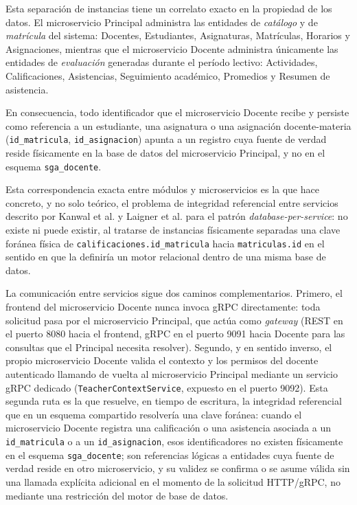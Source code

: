 \documentclass[11pt,a4paper]{article}
\begin{document}
Esta separación de instancias tiene un correlato exacto en la propiedad de los datos. El microservicio Principal administra las entidades de \emph{catálogo} y de \emph{matrícula} del sistema: Docentes, Estudiantes, Asignaturas, Matrículas, Horarios y Asignaciones, mientras que el microservicio Docente administra únicamente las entidades de \emph{evaluación} generadas durante el período lectivo: Actividades, Calificaciones, Asistencias, Seguimiento académico, Promedios y Resumen de asistencia. 

En consecuencia, todo identificador que el microservicio Docente recibe y persiste como referencia a un estudiante, una asignatura o una asignación docente-materia (\texttt{id\_matricula}, \texttt{id\_asignacion}) apunta a un registro cuya fuente de verdad reside físicamente en la base de datos del microservicio Principal, y no en el esquema \texttt{sga\_docente}.

Esta correspondencia exacta entre módulos y microservicios es la que hace concreto, y no solo teórico, el problema de integridad referencial entre servicios descrito por Kanwal et al. y Laigner et al. para el patrón \emph{database-per-service}: no existe ni puede existir, al tratarse de instancias físicamente separadas una clave foránea física de \texttt{calificaciones.id\_matricula} hacia \texttt{matriculas.id} en el sentido en que la definiría un motor relacional dentro de una misma base de datos. 

La comunicación entre servicios sigue dos caminos complementarios. Primero, el frontend del microservicio Docente nunca invoca gRPC directamente: toda solicitud pasa por el microservicio Principal, que actúa como \emph{gateway} (REST en el puerto 8080 hacia el frontend, gRPC en el puerto 9091 hacia Docente para las consultas que el Principal necesita resolver). Segundo, y en
sentido inverso, el propio microservicio Docente valida el contexto y los permisos del docente autenticado llamando de vuelta al microservicio Principal mediante un servicio gRPC dedicado (\texttt{TeacherContextService}, expuesto en el puerto 9092). Esta segunda ruta es la que resuelve, en tiempo de escritura, la integridad referencial que en un esquema compartido resolvería una clave foránea: cuando el microservicio Docente registra una calificación o una
asistencia asociada a un \texttt{id\_matricula} o a un \texttt{id\_asignacion}, esos identificadores no existen físicamente en el esquema \texttt{sga\_docente}; son referencias lógicas a entidades cuya fuente de verdad reside en otro microservicio, y su validez se confirma o se asume válida sin una llamada explícita adicional en el momento de la solicitud HTTP/gRPC, no mediante una restricción del motor de base de datos.
\end{document}
